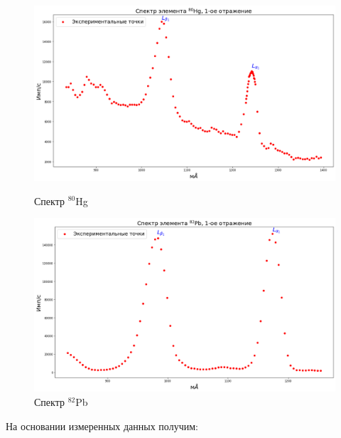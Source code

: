 \documentclass[a4paper, 12pt]{article}%
\begin{document}
		\begin{figure}[h!]
			\begin{minipage}[h]{0.49\textwidth}
				\begin{center}
					\includegraphics[width=1.02\linewidth]{Спектры/Hg.png}
					\caption{Спектр $^{80}$Hg}
				\end{center}
			\end{minipage}
			\hfill
			\begin{minipage}[h]{0.49\textwidth}
				\begin{center}
					\includegraphics[width=1.02\linewidth]{Спектры/Pb.png}
					\caption{Спектр $^{82}$Pb}
				\end{center}
			\end{minipage}
		\end{figure}

	На основании измеренных данных получим:
\end{document}
